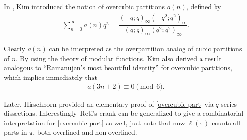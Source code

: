 \documentclass[12pt]{amsart}
\numberwithin{equation}{section}
\theoremstyle{plain}
\theoremstyle{definition}
\begin{document}
In \cite{Kim4}, Kim introduced the notion of overcubic partitions $\overline{a}(n)$, defined by
\begin{align*}
\sum_{n=0}^{\infty}\overline{a}(n)q^{n}=\dfrac{(-q;q)_{\infty}(-q^{2};q^{2})_{\infty}}{(q;q)_{\infty}(q^{2};q^{2})_{\infty}}.
\end{align*}

Clearly $\overline{a}(n)$ can be interpreted as the overpartition analog of cubic partitions of $n$. By using the theory of modular functions, Kim also derived a result analogous to ``Ramanujan's most beautiful identity'' \cite{Ram} for overcubic partitions, which implies immediately that
\begin{align}
\overline{a}(3n+2)\equiv0\pmod{6}.\label{overcubic part}
\end{align}

Later, Hirschhorn \cite{Hir2} provided an elementary proof of \eqref{overcubic part} via $q$-series dissections. Interestingly, Reti's crank can be generalized to give a combinatorial interpretation for \eqref{overcubic part} as well, just note that now $\ell(\pi)$ counts all parts in $\pi$, both overlined and non-overlined.
\end{document}
